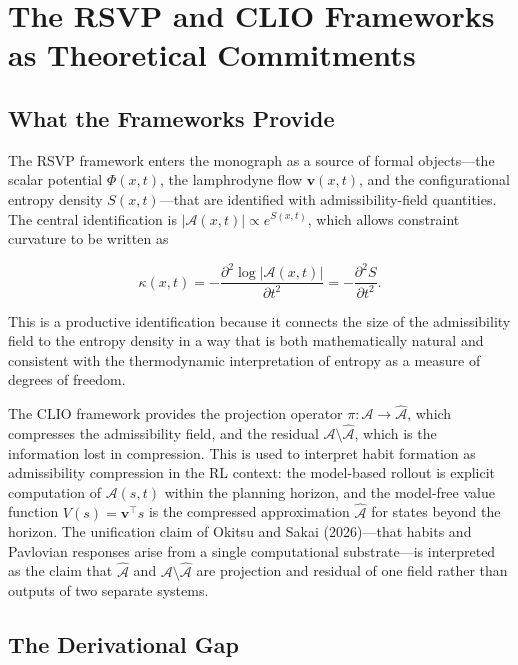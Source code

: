 \documentclass[12pt, a4paper]{article}
\theoremstyle{definition}
\begin{document}
\section{The RSVP and CLIO Frameworks as Theoretical Commitments}

\subsection{What the Frameworks Provide}

The RSVP framework enters the monograph as a source of formal objects---the scalar potential $\Phi(x,t)$, the lamphrodyne flow $\mathbf{v}(x,t)$, and the configurational entropy density $S(x,t)$---that are identified with admissibility-field quantities. The central identification is $|\mathcal{A}(x,t)| \propto e^{S(x,t)}$, which allows constraint curvature to be written as

\begin{equation}
\kappa(x,t) = -\frac{\partial^2 \log |\mathcal{A}(x,t)|}{\partial t^2} = -\frac{\partial^2 S}{\partial t^2}.
\end{equation}

This is a productive identification because it connects the size of the admissibility field to the entropy density in a way that is both mathematically natural and consistent with the thermodynamic interpretation of entropy as a measure of degrees of freedom.

The CLIO framework provides the projection operator $\pi : \mathcal{A} \to \hat{\mathcal{A}}$, which compresses the admissibility field, and the residual $\mathcal{A} \setminus \hat{\mathcal{A}}$, which is the information lost in compression. This is used to interpret habit formation as admissibility compression in the RL context: the model-based rollout is explicit computation of $\mathcal{A}(s,t)$ within the planning horizon, and the model-free value function $V(s) = \mathbf{v}^\top s$ is the compressed approximation $\hat{\mathcal{A}}$ for states beyond the horizon. The unification claim of Okitsu and Sakai (2026)---that habits and Pavlovian responses arise from a single computational substrate---is interpreted as the claim that $\hat{\mathcal{A}}$ and $\mathcal{A} \setminus \hat{\mathcal{A}}$ are projection and residual of one field rather than outputs of two separate systems.

\subsection{The Derivational Gap}
\end{document}
